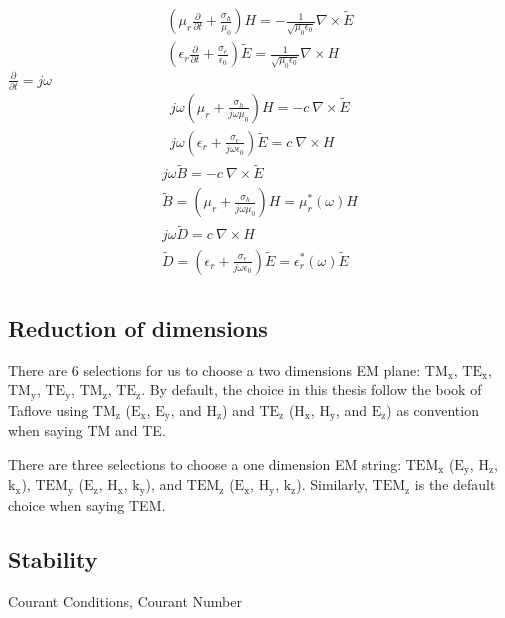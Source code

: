 \begin{gather}
  \left(\mu_r\frac{\partial}{\partial t} + \frac{\sigma_h}{\mu_0}\right)H = - \frac{1}{\sqrt{\mu_0\epsilon_0}}\nabla\times\widetilde{E}\\
  \left(\epsilon_r\frac{\partial}{\partial t} + \frac{\sigma_e}{\epsilon_0}\right)\widetilde{E} = \frac{1}{\sqrt{\mu_0\epsilon_0}}\nabla\times H
\end{gather}
$\frac{\partial}{\partial t} = j\omega$
\begin{gather}
  j\omega\left(\mu_r + \frac{\sigma_h}{j\omega\mu_0}\right)H = - c\ \nabla\times\widetilde{E}\\
  j\omega\left(\epsilon_r + \frac{\sigma_e}{j\omega\epsilon_0}\right)\widetilde{E} = c\ \nabla\times H
\end{gather}
\begin{gather}
    j\omega\widetilde{B} = -c\ \nabla\times\widetilde{E}\\
    \widetilde{B} = \left(\mu_r + \frac{\sigma_h}{j\omega\mu_0}\right)H = \mu_r^*(\omega)H\\
    j\omega\widetilde{D} = c\ \nabla\times H \\
    \widetilde{D} = \left(\epsilon_r + \frac{\sigma_e}{j\omega\epsilon_0}\right)\widetilde{E} = \epsilon_r^*(\omega)\widetilde{E}\\
\end{gather}








\subsection{Reduction of dimensions}

There are 6 selections for us to choose a two dimensions EM plane: $\mathrm{TM_{x}} $, $\mathrm{TE_{x}}$,
$\mathrm{TM_{y}}$, $\mathrm{TE_{y}}$, $\mathrm{TM_{z}}$, $\mathrm{TE_{z}}$. By default, the choice in this thesis follow
the book of Taflove using $\mathrm{TM_{z}}$ ($\mathrm{E_x}$, $\mathrm{E_y}$, and $\mathrm{H_z}$) and $\mathrm{TE_{z}}$
($\mathrm{H_x}$, $\mathrm{H_y}$, and $\mathrm{E_z}$) as convention when saying TM and TE.

There are three selections to choose a one dimension EM string: $\mathrm{TEM_x}$ ($\mathrm{E_{y}}$, $\mathrm{H_{z}}$,
$\mathrm{k_x}$), $\mathrm{TEM_y}$ ($\mathrm{E_z}$, $\mathrm{H_x}$, $\mathrm{k_y}$), and $\mathrm{TEM_z}$
($\mathrm{E_x}$, $\mathrm{H_y}$, $\mathrm{k_z}$). Similarly, $\mathrm{TEM_z}$ is the default choice when saying TEM.


\subsection{Stability}
Courant Conditions, Courant Number
